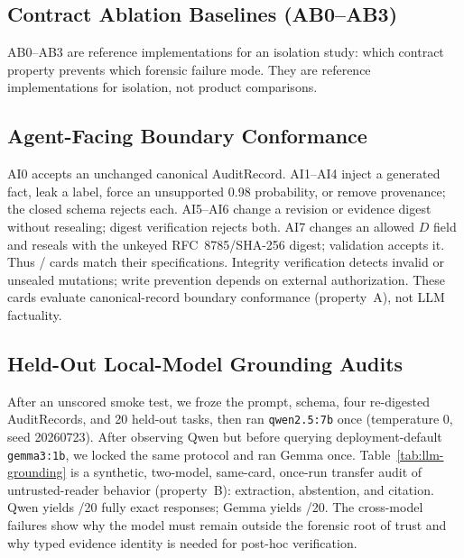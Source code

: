 \subsection{Contract Ablation Baselines (AB0--AB3)}
\label{sec:ab-contract}



AB0--AB3 are reference implementations for an isolation study: which contract property prevents
which forensic failure mode. They are reference implementations for isolation, not product comparisons.

\subsection{Agent-Facing Boundary Conformance}
\label{sec:agent-boundary-conformance}



AI0 accepts an unchanged canonical AuditRecord. AI1--AI4 inject a generated fact, leak a label,
force an unsupported 0.98 probability, or remove provenance; the closed schema rejects each.
AI5--AI6 change a revision or evidence digest without resealing; digest verification rejects both.
AI7 changes an allowed $D$ field and reseals with the unkeyed RFC~8785/SHA-256 digest; validation
accepts it. Thus \AgentBoundaryPass{}/\AgentBoundaryTotal{} cards match their specifications.
Integrity verification detects invalid or unsealed mutations; write prevention depends on external
authorization. These cards evaluate canonical-record boundary conformance (property~A), not LLM
factuality.

\subsection{Held-Out Local-Model Grounding Audits}
\label{sec:llm-grounding-pilot}



After an unscored smoke test, we froze the prompt, schema, four re-digested AuditRecords, and 20
held-out tasks, then ran \texttt{qwen2.5:7b} once (temperature 0, seed 20260723). After observing
Qwen but before querying deployment-default \texttt{gemma3:1b}, we locked the same protocol and ran
Gemma once. Table~\ref{tab:llm-grounding} is a synthetic, two-model, same-card, once-run transfer
audit of untrusted-reader behavior (property~B): extraction, abstention, and citation. Qwen yields
\LlmPilotExact{}/20 fully exact responses; Gemma yields \GemmaPilotExact{}/20. The cross-model
failures show why the model must remain outside the forensic root of trust and why typed evidence
identity is needed for post-hoc verification.

